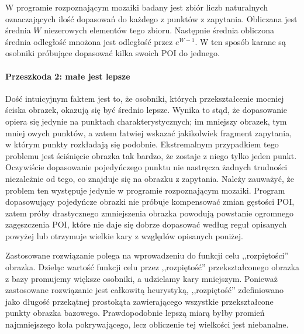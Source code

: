 \documentclass[a4paper,12pt,leqno]{article}
\begin{document}
W programie rozpoznającym mozaiki badany jest zbiór liczb naturalnych oznaczających ilość dopasowań do każdego z punktów z zapytania. Obliczana jest średnia
$W$ niezerowych elementów tego zbioru. Następnie średnia obliczona średnia odległość mnożona jest odległość przez $e^{W-1}$. W ten sposób karane są
osobniki próbujące dopasować kilka swoich POI do jednego.

\paragraph{Przeszkoda 2: małe jest lepsze}
Dość intuicyjnym faktem jest to, że osobniki, których przekształcenie mocniej ściska obrazek, okazują się być średnio lepsze. Wynika to stąd, że dopasowanie opiera
się jedynie na punktach charakterystycznych; im mniejszy obrazek, tym mniej owych punktów, a zatem łatwiej wskazać jakikolwiek fragment zapytania, w którym punkty
rozkładają się podobnie. Ekstremalnym przypadkiem tego problemu jest ściśnięcie obrazka tak bardzo, że zostaje z niego tylko jeden punkt. Oczywiście dopasowanie
pojedyńczego punktu nie nastręcza żadnych trudności niezależnie od tego, co znajduje się na obrazku z zapytania. Należy zauważyć, że problem ten występuje jedynie
w programie rozpoznającym mozaiki. Program dopasowujący pojedyńcze obrazki nie próbuje kompensować zmian gęstości POI, zatem próby drastycznego zmniejszenia obrazka
powodują powstanie ogromnego zagęszczenia POI, które nie daje się dobrze dopasować według reguł opisanych powyżej lub otrzymuje wielkie kary z względów opisanych poniżej.

Zastosowane rozwiązanie polega na wprowadzeniu do funkcji celu ,,rozpiętości'' obrazka. Dzieląc wartość funkcji celu przez ,,rozpiętość'' przekształconego obrazka z 
bazy promujemy większe osobniki, a udzielamy kary mniejszym. Ponieważ zastosowane rozwiązanie jest całkowitą heurystyką, ,,rozpiętość'' zdefiniowano jako długość
przekątnej prostokąta zawierającego wszystkie przekształcone punkty obrazka bazowego. Prawdopodobnie lepszą miarą byłby promień najmniejszego koła pokrywającego,
lecz obliczenie tej wielkości jest niebanalne.
\end{document}
